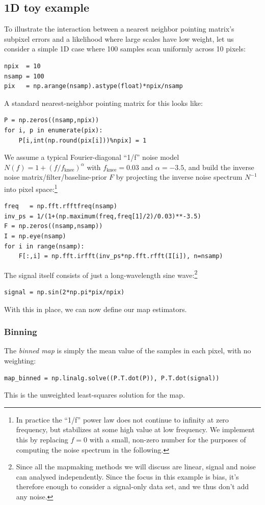 \documentclass{aa}
\begin{document}
\subsection{1D toy example}
To illustrate the interaction between a nearest neighbor pointing matrix's
subpixel errors and a likelihood where large scales have low weight, let
us consider a simple 1D case where 100 samples scan uniformly across 10 pixels:
\begin{lstlisting}
npix  = 10
nsamp = 100
pix   = np.arange(nsamp).astype(float)*npix/nsamp
\end{lstlisting}
A standard nearest-neighbor pointing matrix for this looks like:
\begin{lstlisting}
P = np.zeros((nsamp,npix))
for i, p in enumerate(pix):
	P[i,int(np.round(pix[i]))%npix] = 1
\end{lstlisting}
We assume a typical Fourier-diagonal ``1/f'' noise model
$N(f) = 1+(f/f_\text{knee})^\alpha$
with $f_\text{knee}=0.03$ and $\alpha=-3.5$, and build the
inverse noise matrix/filter/baseline-prior $F$ by
projecting the inverse noise spectrum $N^{-1}$ into pixel space:\footnote{
	In practice the ``1/f'' power law does not continue to infinity at zero
	frequency, but stabilizes at some high value at low frequency. We implement
	this by replacing $f=0$ with a small, non-zero number for the purposes of
	computing the noise spectrum in the following.
}
\begin{lstlisting}
freq   = np.fft.rfftfreq(nsamp)
inv_ps = 1/(1+(np.maximum(freq,freq[1]/2)/0.03)**-3.5)
F = np.zeros((nsamp,nsamp))
I = np.eye(nsamp)
for i in range(nsamp):
	F[:,i] = np.fft.irfft(inv_ps*np.fft.rfft(I[i]), n=nsamp)
\end{lstlisting}
The signal itself consists of just a long-wavelength sine wave:\footnote{
Since all the mapmaking methods we will discuss are linear,
signal and noise can analysed independently. Since the focus
in this example is bias, it's therefore enough to consider a
signal-only data set, and we thus don't add any noise.}
\begin{lstlisting}
signal = np.sin(2*np.pi*pix/npix)
\end{lstlisting}

With this in place, we can now define our map estimators.

\subsubsection{Binning}
The \emph{binned map} is simply the mean value of the samples
in each pixel, with no weighting:
\begin{lstlisting}
map_binned = np.linalg.solve((P.T.dot(P)), P.T.dot(signal))
\end{lstlisting}
This is the unweighted least-squares solution for the map.
\end{document}
